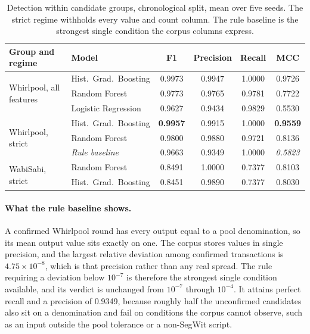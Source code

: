 \documentclass[12pt,a4paper]{article}
\begin{document}
\begin{table}[htbp]
\centering
\small
\caption{Detection within candidate groups, chronological split,
mean over five seeds. The strict regime withholds every value and
count column. The rule baseline is the strongest single condition
the corpus columns express.}
\label{tab:confirmed_detection}
\begin{tabular}{llcccc}
\toprule
Group and regime & Model & F1 & Precision & Recall & MCC \\
\midrule
\multirow{3}{*}{Whirlpool, all features}
 & Hist.\ Grad.\ Boosting & 0.9973 & 0.9947 & 1.0000 & 0.9726 \\
 & Random Forest          & 0.9773 & 0.9765 & 0.9781 & 0.7722 \\
 & Logistic Regression    & 0.9627 & 0.9434 & 0.9829 & 0.5530 \\
\midrule
\multirow{3}{*}{Whirlpool, strict}
 & Hist.\ Grad.\ Boosting & \textbf{0.9957} & 0.9915 & 1.0000 & \textbf{0.9559} \\
 & Random Forest          & 0.9800 & 0.9880 & 0.9721 & 0.8136 \\
 & \textit{Rule baseline} & 0.9663 & 0.9349 & 1.0000 & \textit{0.5823} \\
\midrule
\multirow{2}{*}{WabiSabi, strict}
 & Random Forest          & 0.8491 & 1.0000 & 0.7377 & 0.8103 \\
 & Hist.\ Grad.\ Boosting & 0.8451 & 0.9890 & 0.7377 & 0.8030 \\
\bottomrule
\end{tabular}
\end{table}

\paragraph{What the rule baseline shows.}
A confirmed Whirlpool round has every output equal to a pool
denomination, so its mean output value sits exactly on one. The
corpus stores values in single precision, and the largest
relative deviation among confirmed transactions is
$4.75 \times 10^{-8}$, which is that precision rather than any
real spread. The rule requiring a deviation below $10^{-7}$ is
therefore the strongest single condition available, and its
verdict is unchanged from $10^{-7}$ through $10^{-4}$. It attains
perfect recall and a precision of 0.9349, because roughly half
the unconfirmed candidates also sit on a denomination and fail on
conditions the corpus cannot observe, such as an input outside
the pool tolerance or a non-SegWit script.
\end{document}

